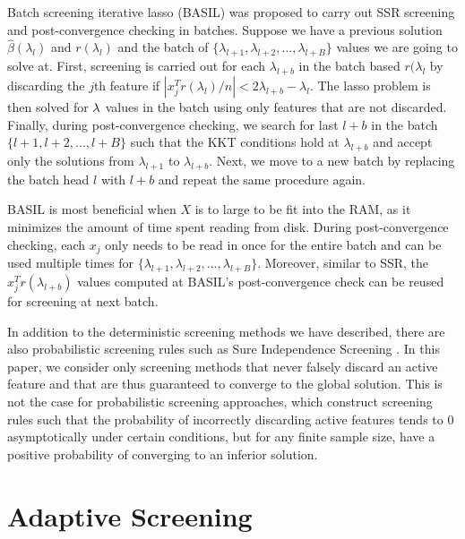 Batch screening iterative lasso (BASIL) \citep{qian2019fast} was proposed to carry out SSR screening and post-convergence checking in batches. Suppose we have a previous solution $\hat{\beta}(\lambda_l)$ and $r(\lambda_l)$ and the batch of $\{\lambda_{l+1},\lambda_{l+2},...,\lambda_{l+B}\}$ values we are going to solve at. First, screening is carried out for each $\lambda_{l+b}$ in the batch based $r(\lambda_l$ by discarding the $j$th feature if $|x_j^Tr(\lambda_l)/n|<2\lambda_{l+b}-\lambda_l$. The lasso problem is then solved for $\lambda$ values in the batch using only features that are not discarded. Finally, during post-convergence checking, we search for last $l+b$ in the batch $\{l+1,l+2,...,l+B\}$ such that the KKT conditions hold at $\lambda_{l+b}$ and accept only the solutions from $\lambda_{l+1}$ to $\lambda_{l+b}$. Next, we move to a new batch by replacing the batch head $l$ with $l+b$ and repeat the same procedure again.

BASIL is most beneficial when $X$ is to large to be fit into the RAM, as it minimizes the amount of time spent reading from disk. During post-convergence checking, each $x_j$ only needs to be read in once for the entire batch and can be used multiple times for $\{\lambda_{l+1},\lambda_{l+2},...,\lambda_{l+B}\}$. Moreover, similar to SSR, the $x_j^Tr(\lambda_{l+b})$ values computed at BASIL's post-convergence check can be reused for screening at next batch.

In addition to the deterministic screening methods we have described, there are also probabilistic screening rules such as Sure Independence Screening \citep{Fan2008}. In this paper, we consider only screening methods that never falsely discard an active feature and that are thus guaranteed to converge to the global solution. This is not the case for probabilistic screening approaches, which construct screening rules such that the probability of incorrectly discarding active features tends to 0 asymptotically under certain conditions, but for any finite sample size, have a positive probability of converging to an inferior solution.

\section{Adaptive Screening}
\label{sec:method}


